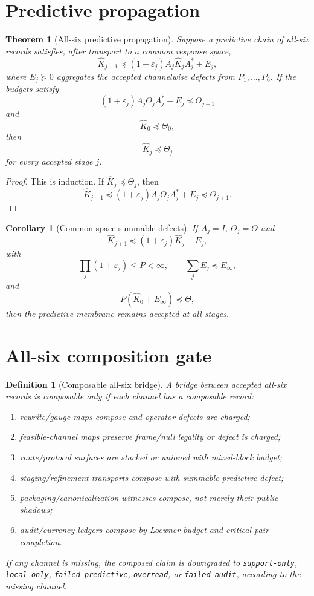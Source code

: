 \documentclass[11pt]{article}
\newtheorem{theorem}{Theorem}
\newtheorem{definition}{Definition}
\newtheorem{corollary}{Corollary}
\newcommand{\suc}{\succeq}
\begin{document}
\section{Predictive propagation}
\begin{theorem}[All-six predictive propagation]
Suppose a predictive chain of all-six records satisfies, after transport to a common response space,
\[
\widehat K_{j+1}\preceq (1+\varepsilon_j)A_j\widehat K_jA_j^*+E_j,
\]
where $E_j\suc0$ aggregates the accepted channelwise defects from $P_1,\ldots,P_6$.  If the budgets satisfy
\[
(1+\varepsilon_j)A_j\Theta_jA_j^*+E_j\preceq \Theta_{j+1}
\]
and
\[
\widehat K_0\preceq\Theta_0,
\]
then
\[
\widehat K_j\preceq\Theta_j
\]
for every accepted stage $j$.
\end{theorem}

\begin{proof}
This is induction.  If $\widehat K_j\preceq\Theta_j$, then
\[
\widehat K_{j+1}\preceq (1+\varepsilon_j)A_j\Theta_jA_j^*+E_j\preceq\Theta_{j+1}.
\]
\end{proof}

\begin{corollary}[Common-space summable defects]
If $A_j=I$, $\Theta_j=\Theta$ and
\[
\widehat K_{j+1}\preceq (1+\varepsilon_j)\widehat K_j+E_j,
\]
with
\[
\prod_j(1+\varepsilon_j)\le P<\infty,
\qquad
\sum_jE_j\preceq E_\infty,
\]
and
\[
P(\widehat K_0+E_\infty)\preceq\Theta,
\]
then the predictive membrane remains accepted at all stages.
\end{corollary}

\section{All-six composition gate}
\begin{definition}[Composable all-six bridge]
A bridge between accepted all-six records is composable only if each channel has a composable record:
\begin{enumerate}[label=$P_\arabic*$:]
\item rewrite/gauge maps compose and operator defects are charged;
\item feasible-channel maps preserve frame/null legality or defect is charged;
\item route/protocol surfaces are stacked or unioned with mixed-block budget;
\item staging/refinement transports compose with summable predictive defect;
\item packaging/canonicalization witnesses compose, not merely their public shadows;
\item audit/currency ledgers compose by Loewner budget and critical-pair completion.
\end{enumerate}
If any channel is missing, the composed claim is downgraded to \texttt{support-only}, \texttt{local-only}, \texttt{failed-predictive}, \texttt{overread}, or \texttt{failed-audit}, according to the missing channel.
\end{definition}
\end{document}
